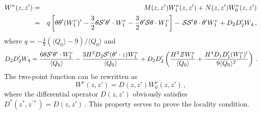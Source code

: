 \documentclass[a4paper,11pt,showpacs,preprintnumbers]{revtex4}
\def\z {{\cal Z}}
\begin{document}
\begin{appendix}
\begin{eqnarray*}
W^{\nu}(z,z')&=&M(z,z')W_{1}^{\nu}(z,z')+N(z,z')W_{0}^{\nu}(z,z')\nonumber
\\ &=& q\left[\theta \theta' (W_{1}^{\nu})'-\frac{3}{2}\theta{\cal
S}'\theta'\cdot W^{\nu}_{1}- \frac{3}{2}\theta'{\cal S}\theta\cdot
W^{\nu}_{1}\right] -\,{\cal S }{\cal S' } \theta\cdot\theta'
W_{1}^{\nu} +D_2D_2'W_{4}\,,
\end{eqnarray*}
where $q=-\frac{4}{9}\left({\langle
Q_{0}\rangle-9}\right)/{\langle Q_{0}\rangle}$ and
\begin{equation*}
D_{2}D'_{2} W_{4}=\frac{6\theta{\cal S }'\theta'\cdot
W^{\nu}_{1}}{\langle Q_{0}\rangle}-\frac{3H^{2}D_{2}{\cal S
}'(\theta'\cdot z)W^{\nu}_{1}}{\langle Q_{0}\rangle}
+D_{2}D'_{2}\left(\frac{H^{2}\z   W^{\nu}_{1}}{\langle
Q_{0}\rangle}+\frac{H^{4}D_{1}D'_{1}( W^{\nu}_{1})'}{9\langle
Q_{0}\rangle^{2}}\right)\,.
\end{equation*}
The two-point function can be rewritten as
$$W^{\nu}(z,z')=D(z,z')W_{0}^{\nu}(z,z')\,,$$
where the differential operator $D(z,z')$ obviously satisfies
$D^{*}(z^{*},z^{'*})=D(z,z')\,$. This property serves to prove the
locality condition.
\end{appendix}
\newpage
\end{document}
